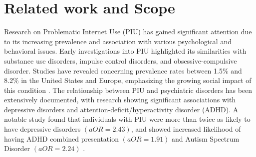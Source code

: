 \documentclass[12pt]{extarticle}
\begin{document}


\section{Related work and Scope} 

    Research on Problematic Internet Use (PIU) has gained significant attention due to its increasing prevalence and association with various psychological and behavioral issues. 
    Early investigations into PIU highlighted its similarities with substance use disorders, impulse control disorders, and obsessive-compulsive disorder.
    Studies have revealed concerning prevalence rates between 1.5\% and 8.2\% in the United States and Europe, emphasizing the growing social impact of this condition \cite{Cash2012-rb}. 
    The relationship between PIU and psychiatric disorders has been extensively documented, with research showing significant associations with depressive disorders and attention-deficit/hyperactivity disorder (ADHD). 
    A notable study found that individuals with PIU were more than twice as likely to have depressive disorders $(aOR = 2.43)$, and showed increased likelihood of having ADHD combined presentation $(aOR = 1.91)$ and Autism Spectrum Disorder $(aOR = 2.24)$ \cite{Restrepo2020-pb}.
    
\end{document}
